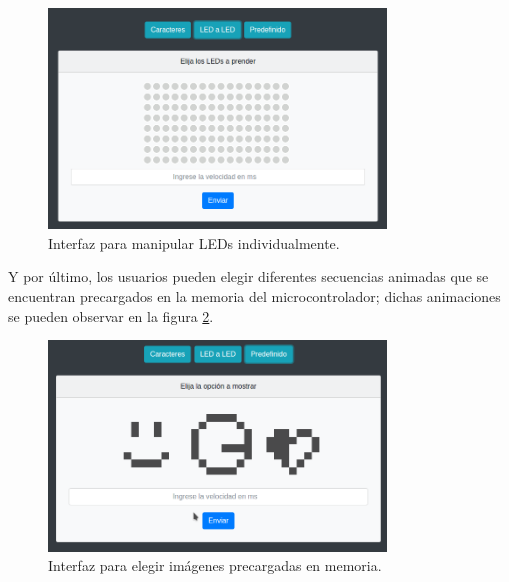     \begin{figure}[ht!]
    	\centering
    	\begin{center}
    		\includegraphics[width=0.8\textwidth]{imagenes/web/matriz.png}
    		\caption{Interfaz para manipular LEDs individualmente.}
    		\label{fig:Web-matrix}
    	\end{center}
    \end{figure}
    
    \vspace{5mm}
    
    Y por último, los usuarios pueden elegir diferentes secuencias animadas que se encuentran precargados en la memoria del microcontrolador; dichas animaciones se pueden observar en la figura \ref{fig:Web-predefined}.

    \begin{figure}[ht!]
    	\centering
    	\begin{center}
    		\includegraphics[width=0.8\textwidth]{imagenes/web/predef.png}
    		\caption{Interfaz para elegir imágenes precargadas en memoria.}
    		\label{fig:Web-predefined}
    	\end{center}
    \end{figure}

